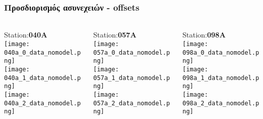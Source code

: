 %  

\begin{frame}
  \frametitle{Προσδιορισμός ασυνεχειών - offsets}
  \framesubtitle{}
  \label{}
  \vskip-1cm
  \begin{columns}[T]
    \begin{column}{.33\textwidth}
      \begin{center}
      Station:\textbf{040A}\\
         \texttt{[image: 040a\_0\_data\_nomodel.png]}\\
         \texttt{[image: 040a\_1\_data\_nomodel.png]}\\
         \texttt{[image: 040a\_2\_data\_nomodel.png]}
       \end{center} 
    \end{column}
    \begin{column}{.33\textwidth}
      \begin{center}
      Station:\textbf{057A}\\
         \texttt{[image: 057a\_0\_data\_nomodel.png]}\\
         \texttt{[image: 057a\_1\_data\_nomodel.png]}\\
         \texttt{[image: 057a\_2\_data\_nomodel.png]}
       \end{center} 
    \end{column}
    \begin{column}{.33\textwidth}
      \begin{center}
      Station:\textbf{098A}\\
         \texttt{[image: 098a\_0\_data\_nomodel.png]}\\
         \texttt{[image: 098a\_1\_data\_nomodel.png]}\\
         \texttt{[image: 098a\_2\_data\_nomodel.png]}
       \end{center} 
      
    \end{column}
  \end{columns}
\end{frame}
\note{}

